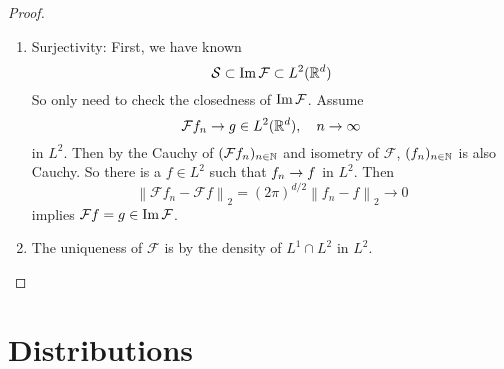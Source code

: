 \begin{enumerate}[label=\arabic*.]
\begin{proof}
\begin{enumerate}[label=\Roman*.]
			\item Surjectivity: First, we have known
			\begin{equation*}
				\mathcal{S} \subset \operatorname{Im}\mathcal{F} \subset L^2(\mathbb{R}^d)
			\end{equation*}
			So only need to check the closedness of $\operatorname{Im}\mathcal{F}$. Assume
			\begin{equation*}
				\mathcal{F}f_n \rightarrow g \in L^2(\mathbb{R}^d),\quad n \rightarrow \infty
			\end{equation*}
			in $L^2$. Then by the Cauchy of $(\mathcal{F}f_n)_{n \in \mathbb{N}}$ and isometry of $\mathcal{F}$, $(f_n)_{n \in \mathbb{N}}$ is also Cauchy. So there is a $f \in L^2$ such that $f_n \rightarrow f$ in $L^2$. Then
			\begin{equation*}
				\left\|\mathcal{F} f_n-\mathcal{F} f\right\|_2=(2 \pi)^{d / 2}\left\|f_n-f\right\|_2 \rightarrow 0
			\end{equation*}
			implies $\mathcal{F} f = g \in \operatorname{Im}\mathcal{F}$.

			\item The uniqueness of $\mathcal{F}$ is by the density of $L^1 \cap L^2$ in $L^2$.
		\end{enumerate}
	\end{proof}
\end{enumerate}

\section{Distributions}

